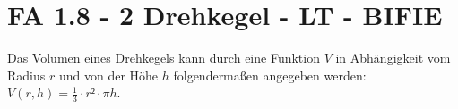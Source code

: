\section{FA 1.8 - 2 Drehkegel - LT - BIFIE}

\begin{beispiel}[FA 1.8]{1} %
Das Volumen eines Drehkegels kann durch eine Funktion $V$ in Abhängigkeit vom Radius $r$ und von der Höhe $h$ folgendermaßen angegeben werden: \mbox{$V(r,h)=\frac{1}{3}\cdot r²\cdot \pi h$}.
\leer

\end{beispiel}